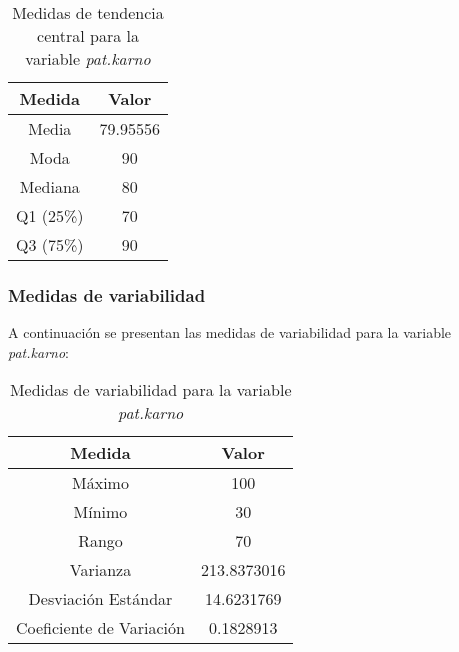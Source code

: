 \documentclass[a4paper,12pt]{article}
\begin{document}
    \begin{table}[h!]
        \centering
        \begin{tabular}{|c|c|}
            \hline
            \textbf{Medida} & \textbf{Valor} \\
            \hline
            Media & 79.95556 \\
            \hline
            Moda & 90 \\
            \hline
            Mediana & 80 \\
            \hline
            Q1 (25\%) & 70 \\
            \hline
            Q3 (75\%) & 90 \\
            \hline
        \end{tabular}
        \caption{Medidas de tendencia central para la variable \textit{pat.karno}}
        \label{tab:medidas_tendencia_central_pat_karno}
    \end{table}
    
    \newpage

    \subsubsection*{Medidas de variabilidad}
    
    A continuación se presentan las medidas de variabilidad para la variable \textit{pat.karno}:
    
    \begin{table}[h!]
        \centering
        \begin{tabular}{|c|c|}
            \hline
            \textbf{Medida} & \textbf{Valor} \\
            \hline
            Máximo & 100 \\
            \hline
            Mínimo & 30 \\
            \hline
            Rango & 70 \\
            \hline
            Varianza & 213.8373016 \\
            \hline
            Desviación Estándar & 14.6231769 \\
            \hline
            Coeficiente de Variación & 0.1828913 \\
            \hline
        \end{tabular}
        \caption{Medidas de variabilidad para la variable \textit{pat.karno}}
        \label{tab:medidas_variabilidad_pat_karno}
    \end{table}
\end{document}
